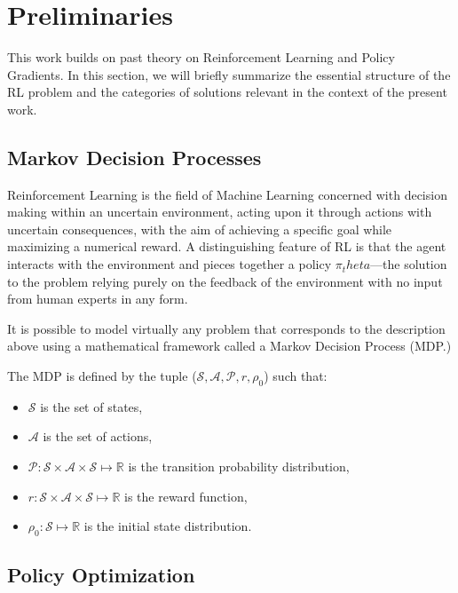 \section{Preliminaries}
\label{sec:prelim}
This work builds on past theory on Reinforcement Learning and Policy Gradients. In this section, we will briefly summarize the essential structure of the RL problem and the categories of solutions relevant in the context of the present work.

\subsection{Markov Decision Processes}

Reinforcement Learning is the field of Machine Learning concerned with decision making within an uncertain environment, acting upon it through actions with uncertain consequences, with the aim of achieving a specific goal while maximizing a numerical reward. A distinguishing feature of RL is that the agent interacts with the environment and pieces together a policy $\pi_theta$––the solution to the problem relying purely on the feedback of the environment with no input from human experts in any form. 

It is possible to model virtually any problem that corresponds to the description above using a mathematical framework called a Markov Decision Process (MDP.) 

The MDP is defined by the tuple ($\mathcal{S}, \mathcal{A}, \mathcal{P}, r, \rho_0$) such that:
\begin{itemize}
\item $\mathcal{S}$ is the set of states, 
\item $\mathcal{A}$ is the set of actions, 
\item $\mathcal{P}: \mathcal{S}\times\mathcal{A}\times\mathcal{S}\mapsto \mathbb{R}$ is the transition probability distribution,
\item $r: \mathcal{S}\times\mathcal{A}\times\mathcal{S} \mapsto \mathbb{R}$ is the reward function,
\item $\rho_0:\mathcal{S}\mapsto\mathbb{R}$ is the initial state distribution.
\end{itemize}

\subsection{Policy Optimization}



